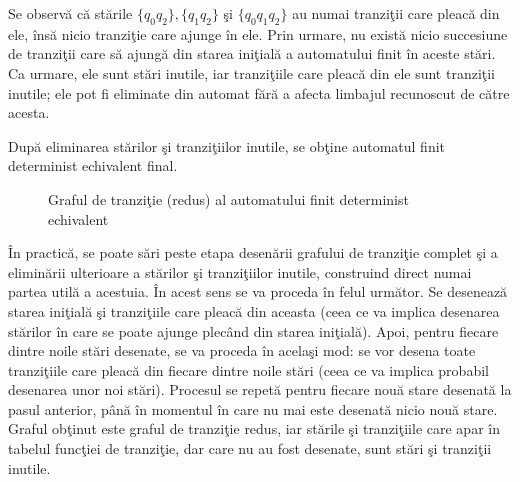 Se observă că stările $ \{q_0 q_2\}, \{q_1 q_2\} $ şi $ \{ q_0 q_1 q_2 \} $ au numai tranziţii care pleacă din ele, însă nicio tranziţie care ajunge în ele. Prin urmare, nu există nicio succesiune de tranziţii care să ajungă din starea iniţială a automatului finit în aceste stări. Ca urmare, ele sunt stări inutile, iar tranziţiile care pleacă din ele sunt tranziţii inutile; ele pot fi eliminate din automat fără a afecta limbajul recunoscut de către acesta. 

După eliminarea stărilor şi tranziţiilor inutile, se obţine automatul finit determinist echivalent final.

\begin{figure}[H]
\centering
{}
\caption{Graful de tranziţie (redus) al automatului finit determinist echivalent}
\end{figure}

În practică, se poate sări peste etapa desenării grafului de tranziţie complet şi a eliminării ulterioare a stărilor şi tranziţiilor inutile, construind direct numai partea utilă a acestuia. În acest sens se va proceda în felul următor. Se desenează starea iniţială şi tranziţiile care pleacă din aceasta (ceea ce va implica desenarea stărilor în care se poate ajunge plecând din starea iniţială). Apoi, pentru fiecare dintre noile stări desenate, se va proceda în acelaşi mod: se vor desena toate tranziţiile care pleacă din fiecare dintre noile stări (ceea ce va implica probabil desenarea unor noi stări). Procesul se repetă pentru fiecare nouă stare desenată la pasul anterior, până în momentul în care nu mai este desenată nicio nouă stare. Graful obţinut este graful de tranziţie redus, iar stările şi tranziţiile care apar în tabelul funcţiei de tranziţie, dar care nu au fost desenate, sunt stări şi tranziţii inutile.

